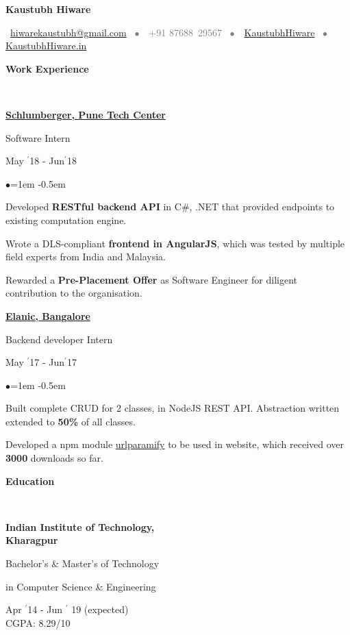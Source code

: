 \documentclass[11pt, a4paper]{resume}
\newcommand{\important}[1]{
  \textcolor{mypurple}{#1}
}
\newcommand{\greyed}[1]{
  \textcolor{gray}{#1}
}
\newcommand{\titleX}[1]{
  \begin{LARGE}
      \important{\centerline{\textbf{#1}}}
    \end{LARGE}
}
\newcommand{\fillit}[1]{
  \leavevmode\xleaders\hbox{#1}\hfill\kern0pt
}
\newcommand{\sectionTitle}[1]{
  \begin{Large}
      \important{\textbf{#1}} 
    \end{Large}
    \important{\rlap{\rule[.5ex]{\linegoal}{0.5pt}}{}}
     \vspace{0.1em}\\
}
\newcommand{\textbox}[1]{
  \parbox{.333\textwidth}{#1}
}
\newenvironment{Jobsection}[3]{ %
\noindent\textbox{\bf #1\hfill}\textbox{\hfil #2\hfil}\textbox{\hfill #3}
  \begin{list}{$\bullet$}{\leftmargin=1em} %
   \itemsep -0.5em \vspace{-0.5em} %
  }{
  \end{list}
  \vspace{0.2em} %
}
\newcommand{\education}[3]{ %
\noindent\parbox{.3\textwidth}{\bf #1\hfill}\parbox{.45\textwidth}{\hfil #2\hfil}\parbox{.25\textwidth}{\hfill #3}
}
\begin{document}
\titleX{Kaustubh Hiware}
\normalsize
\vspace{6pt}
\greyed{\centerline{\faEnvelopeO \, \href{mailto:hiwarekaustubh@gmail.com}{ hiwarekaustubh@gmail.com} \, $\bullet$ \,\faMobile\, +91 87688\, 29567 \, $\bullet$ \,\faGithub \, \href{https://github.com/kaustubhhiware}{KaustubhHiware} \,  $\bullet$ \, \faGlobe \, \href{https://kaustubhhiware.in}{KaustubhHiware.in}}}

\vspace{-2em}
\sectionTitle{Work Experience}
\begin{Jobsection}{\href{https://drive.google.com/file/d/1EcfIC_g8bx3whaxMdOkFyZx4TCqA1RAq/view?usp=sharing}{Schlumberger, Pune Tech Center}}{Software Intern}{ May $^{\prime}$18 - Jun$^{\prime}$18}
\item Developed {\bf RESTful backend API} in C\#, .NET that provided endpoints to existing computation engine.
\item Wrote a DLS-compliant {\bf frontend in AngularJS}, which was tested  by multiple field experts from India and Malaysia.
\item Rewarded a {\bf Pre-Placement Offer} as Software Engineer for diligent contribution to the organisation.
\end{Jobsection}

\begin{Jobsection}{\href{https://drive.google.com/file/d/0B5iU6cWw36rOVWZIcllPY3RSd2c/view?usp=sharing}{Elanic, Bangalore}}{Backend developer Intern}{ May $^{\prime}$17 - Jun$^{\prime}$17}
\item Built complete CRUD for 2 classes, in NodeJS REST API. Abstraction written extended to {\bf 50\%} of all classes.
\item Developed a npm module \href{https://www.npmjs.com/package/urlparamify}{urlparamify} to be used in website, which received over {\bf 3000} downloads so far.
\end{Jobsection}

\sectionTitle{Education\vspace{0.5em}}
\education{Indian Institute of Technology,\\ Kharagpur}{\centerline{Bachelor's \& Master's of Technology} \centerline{in Computer Science \& Engineering}}{Apr $^{\prime}$14 - Jun $^{\prime}$ 19 (expected) \\\hspace*{\fill} CGPA: 8.29/10}
\end{document}
